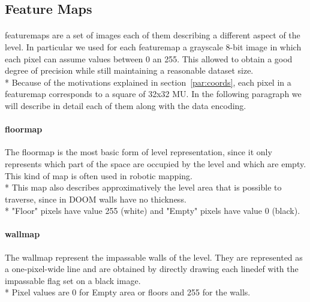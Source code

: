 \subsection{Feature Maps}
\paragraph{} \glspl{featuremap} are a set of images each of them describing a different aspect of the level. In particular we used for each \gls{featuremap} a grayscale 8-bit image in which each pixel can assume values between 0 an 255. This allowed to obtain a good degree of precision while still maintaining a reasonable dataset size. \\*
Because of the motivations explained in section~\ref{par:coords}, each pixel in a \gls{featuremap} corresponds to a square of 32x32 \gls{MU}. 
In the following paragraph we will describe in detail each of them along with the data encoding.

\paragraph{\gls{floormap}} The \gls{floormap} is the most basic form of level representation, since it only represents which part of the space are occupied by the level and which are empty. This kind of map is often used in robotic mapping. \\*
This map also describes approximatively the level area that is possible to traverse, since in DOOM walls have no thickness. \\*
"Floor" pixels have value 255 (white) and "Empty" pixels have value 0 (black).

\paragraph{\gls{wallmap}} The \gls{wallmap} represent the impassable walls of the level. They are represented as a one-pixel-wide line and are obtained by directly drawing each \gls{linedef} with the impassable flag set on a black image. \\*
Pixel values are 0 for Empty area or floors and 255 for the walls.

